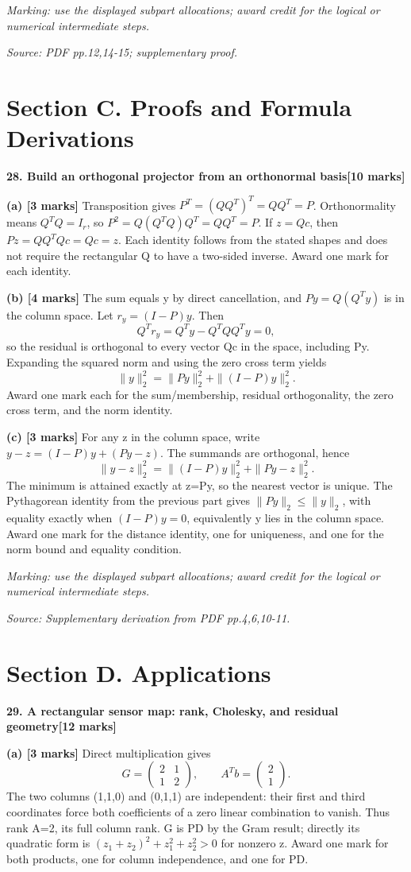 \documentclass[11pt,a4paper]{article}
\begin{document}
\textit{Marking: use the displayed subpart allocations; award credit for the logical or numerical intermediate steps.}\par
{\footnotesize\textit{Source: PDF pp.12,14-15; supplementary proof.}}
\newpage\section*{Section C. Proofs and Formula Derivations}
\textbf{28. Build an orthogonal projector from an orthonormal basis}\hfill\textbf{[10 marks]}\par\medskip
\textbf{(a) [3 marks]} Transposition gives \(P^T=(QQ^T)^T=QQ^T=P\). Orthonormality means \(Q^TQ=I_r\), so \(P^2=Q(Q^TQ)Q^T=QQ^T=P\). If \(z=Qc\), then \(Pz=QQ^TQc=Qc=z\). Each identity follows from the stated shapes and does not require the rectangular Q to have a two-sided inverse. Award one mark for each identity.

\textbf{(b) [4 marks]} The sum equals y by direct cancellation, and \(Py=Q(Q^Ty)\) is in the column space. Let \(r_y=(I-P)y\). Then \[Q^Tr_y=Q^Ty-Q^TQQ^Ty=0,\] so the residual is orthogonal to every vector Qc in the space, including Py. Expanding the squared norm and using the zero cross term yields \[\|y\|_2^2=\|Py\|_2^2+\|(I-P)y\|_2^2.\] Award one mark each for the sum/membership, residual orthogonality, the zero cross term, and the norm identity.

\textbf{(c) [3 marks]} For any z in the column space, write \(y-z=(I-P)y+(Py-z)\). The summands are orthogonal, hence \[\|y-z\|_2^2=\|(I-P)y\|_2^2+\|Py-z\|_2^2.\] The minimum is attained exactly at z=Py, so the nearest vector is unique. The Pythagorean identity from the previous part gives \(\|Py\|_2\leq\|y\|_2\), with equality exactly when \((I-P)y=0\), equivalently y lies in the column space. Award one mark for the distance identity, one for uniqueness, and one for the norm bound and equality condition.

\textit{Marking: use the displayed subpart allocations; award credit for the logical or numerical intermediate steps.}\par
{\footnotesize\textit{Source: Supplementary derivation from PDF pp.4,6,10-11.}}
\newpage\section*{Section D. Applications}
\textbf{29. A rectangular sensor map: rank, Cholesky, and residual geometry}\hfill\textbf{[12 marks]}\par\medskip
\textbf{(a) [3 marks]} Direct multiplication gives \[G=\begin{pmatrix}2&1\\1&2\end{pmatrix},\qquad A^Tb=\begin{pmatrix}2\\1\end{pmatrix}.\] The two columns (1,1,0) and (0,1,1) are independent: their first and third coordinates force both coefficients of a zero linear combination to vanish. Thus rank A=2, its full column rank. G is PD by the Gram result; directly its quadratic form is \((z_1+z_2)^2+z_1^2+z_2^2>0\) for nonzero z. Award one mark for both products, one for column independence, and one for PD.
\end{document}
